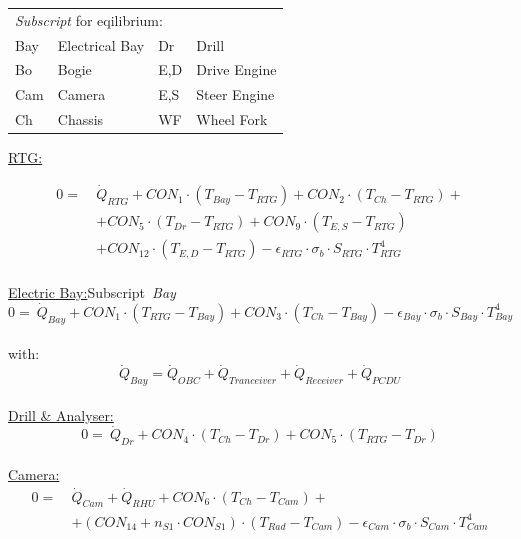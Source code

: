 \begin{table}[H]
	\begin{tabular}{l@{\quad}l@{\qquad\qquad\qquad}l@{\quad}l}
		\multicolumn{4}{l}{\textit{Subscript} for eqilibrium:}\\[0.5em]
		Bay & Electrical Bay & Dr	& Drill\\
		Bo & Bogie & 	E,D & Drive Engine\\
		Cam & Camera & E,S & Steer Engine\\
		Ch & Chassis & WF & Wheel Fork\\
	\end{tabular}

\end{table}

\underline{RTG:}

\begin{equation}
\begin{aligned}
0=\  &\dot{Q}_{RTG} +CON_1 \cdot (T_{Bay}-T_{RTG})+CON_2 \cdot (T_{Ch}-T_{RTG})+ \\[1em]
& + CON_5 \cdot (T_{Dr}-T_{RTG})+ CON_9 \cdot (T_{E,S}-T_{RTG})\\[1em]
& +   CON_12 \cdot (T_{E,D}-T_{RTG}) - \epsilon_{RTG}\cdot \sigma_b \cdot S_{RTG}\cdot T_{RTG}^4 \\[2em]
\end{aligned}
\end{equation}

\underline{Electric Bay:}\quad \small{Subscript\ \textit{Bay}}
\begin{equation}0=\  \dot{Q}_{Bay}+ CON_1 \cdot (T_{RTG}-T_{Bay})+ CON_3 \cdot (T_{Ch}-T_{Bay})  -\epsilon_{Bay}\cdot \sigma_b \cdot S_{Bay}\cdot T_{Bay}^4 \end{equation}\\
with: 
\begin{equation} \dot{Q}_{Bay} = \dot{Q}_{OBC} + \dot{Q}_{Tranceiver} +\dot{Q}_{Receiver} +\dot{Q}_{PCDU} \end{equation}\\

\underline{Drill \& Analyser:}
\begin{equation} 0= \ \dot{Q}_{Dr} +CON_4 \cdot (T_{Ch}-T_{Dr})+CON_5 \cdot (T_{RTG}-T_{Dr})   \end{equation} \\

\underline{Camera:}
\begin{equation}
\begin{aligned}
0=\  &  \dot{Q}_{Cam} + \dot{Q}_{RHU} +CON_6 \cdot (T_{Ch}-T_{Cam})+ \\[1em]
& +(CON_{14} +n_{S1}\cdot CON_{S1}) \cdot (T_{Rad}-T_{Cam})  - \epsilon_{Cam}\cdot \sigma_b \cdot S_{Cam}\cdot T_{Cam}^4 \\[2em]
\end{aligned}
\end{equation}

